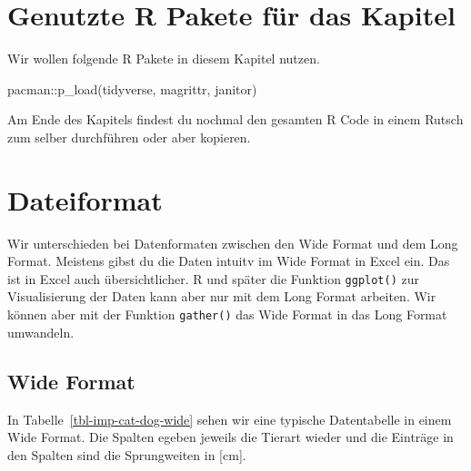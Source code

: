 \documentclass[
  letterpaper,
  DIV=11,
  oneside]{scrreport}
\newenvironment{Shaded}{\begin{snugshade}}{\end{snugshade}}
\newcommand{\FunctionTok}[1]{\textcolor[rgb]{0.28,0.35,0.67}{#1}}
\newcommand{\NormalTok}[1]{\textcolor[rgb]{0.00,0.23,0.31}{#1}}
\newcommand{\SpecialCharTok}[1]{\textcolor[rgb]{0.37,0.37,0.37}{#1}}
\begin{document}
\hypertarget{genutzte-r-pakete-fuxfcr-das-kapitel}{%
\section{Genutzte R Pakete für das
Kapitel}\label{genutzte-r-pakete-fuxfcr-das-kapitel}}

Wir wollen folgende R Pakete in diesem Kapitel nutzen.

\begin{Shaded}
\begin{Highlighting}[]
\NormalTok{pacman}\SpecialCharTok{::}\FunctionTok{p\_load}\NormalTok{(tidyverse, magrittr, janitor)}
\end{Highlighting}
\end{Shaded}

Am Ende des Kapitels findest du nochmal den gesamten R Code in einem
Rutsch zum selber durchführen oder aber kopieren.

\hypertarget{sec-format}{%
\section{Dateiformat}\label{sec-format}}


Wir unterschieden bei Datenformaten zwischen den Wide Format und dem
Long Format. Meistens gibst du die Daten intuitv im Wide Format in Excel
ein. Das ist in Excel auch übersichtlicher. R und später die Funktion
\texttt{ggplot()} zur Visualisierung der Daten kann aber nur mit dem
Long Format arbeiten. Wir können aber mit der Funktion \texttt{gather()}
das Wide Format in das Long Format umwandeln.

\hypertarget{wide-format}{%
\subsection{Wide Format}\label{wide-format}}

In Tabelle~\ref{tbl-imp-cat-dog-wide} sehen wir eine typische
Datentabelle in einem Wide Format. Die Spalten egeben jeweils die
Tierart wieder und die Einträge in den Spalten sind die Sprungweiten in
{[}cm{]}.
\end{document}
